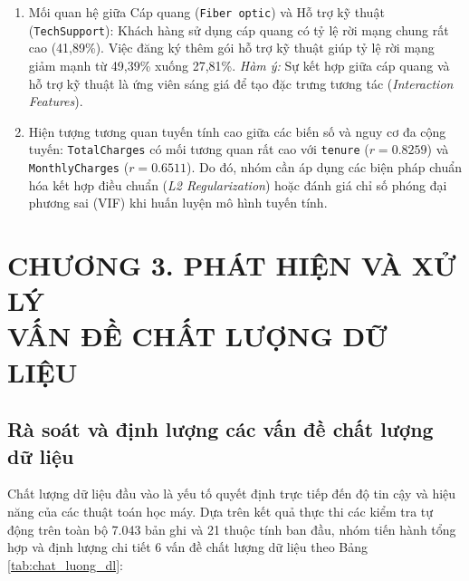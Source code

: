 \documentclass[a4paper]{article}
\begin{document}
{\begin{enumerate}[nosep, topsep=2pt, itemsep=2pt]
    \item Mối quan hệ giữa Cáp quang (\texttt{Fiber optic}) và Hỗ trợ kỹ thuật (\texttt{TechSupport}): Khách hàng sử dụng cáp quang có tỷ lệ rời mạng chung rất cao (41,89\%). Việc đăng ký thêm gói hỗ trợ kỹ thuật giúp tỷ lệ rời mạng giảm mạnh từ 49,39\% xuống 27,81\%. \textit{Hàm ý:} Sự kết hợp giữa cáp quang và hỗ trợ kỹ thuật là ứng viên sáng giá để tạo đặc trưng tương tác (\textit{Interaction Features}).
    
    \item Hiện tượng tương quan tuyến tính cao giữa các biến số và nguy cơ đa cộng tuyến: \texttt{TotalCharges} có mối tương quan rất cao với \texttt{tenure} ($r = 0.8259$) và \texttt{MonthlyCharges} ($r = 0.6511$). Do đó, nhóm cần áp dụng các biện pháp chuẩn hóa kết hợp điều chuẩn (\textit{L2 Regularization}) hoặc đánh giá chỉ số phóng đại phương sai (VIF) khi huấn luyện mô hình tuyến tính.
\end{enumerate}

\vspace{1.5em}
\section[CHƯƠNG 3. PHÁT HIỆN VÀ XỬ LÝ VẤN ĐỀ CHẤT LƯỢNG DỮ LIỆU]{CHƯƠNG 3. PHÁT HIỆN VÀ XỬ LÝ\\VẤN ĐỀ CHẤT LƯỢNG DỮ LIỆU}

\subsection{Rà soát và định lượng các vấn đề chất lượng dữ liệu}
Chất lượng dữ liệu đầu vào là yếu tố quyết định trực tiếp đến độ tin cậy và hiệu năng của các thuật toán học máy. Dựa trên kết quả thực thi các kiểm tra tự động trên toàn bộ 7.043 bản ghi và 21 thuộc tính ban đầu, nhóm tiến hành tổng hợp và định lượng chi tiết 6 vấn đề chất lượng dữ liệu theo Bảng \ref{tab:chat_luong_dl}:

}
\end{document}
